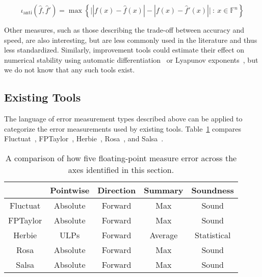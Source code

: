 \documentclass[main.tex]{subfiles}
\begin{document}
\begin{equation*}
\iota_{\text{anti}}(\hat{f},\hat{f}') = \max \left\{ \big| |f(x)-\hat{f}(x)| - |f(x)-\hat{f}'(x)|   
\big|\ :\ x\in \mathbb{F}^n\right\}  
\end{equation*}

Other measures,
  such as those describing the trade-off between accuracy and speed,
  are also interesting, but are less commonly used in the literature
  and thus less standardized.
Similarly,
  improvement tools could estimate their effect on numerical stability
  using automatic differentiation~\cite{} or Lyapunov exponents~\cite{},
  but we do not know that any such tools exist.

\subsection{Existing Tools}

The language of error measurement types described above
  can be applied to categorize the error measurements
  used by existing tools.
Table~\ref{tbl:tools} compares Fluctuat~\cite{Goubault13},
  FPTaylor~\cite{fptaylor-fm15}, Herbie~\cite{pavel15},
  Rosa~\cite{DarulovaK14}, and Salsa~\cite{fmics15}.

\begin{table}[htb]
  \centering
\begin{tabular}{ccccc}
         & Pointwise & Direction & Summary & Soundness \\\hline 
Fluctuat & Absolute        & Forward & Max      & Sound \\
FPTaylor & Absolute        & Forward & Max      & Sound \\
Herbie   & ULPs            & Forward & Average     & Statistical \\
Rosa     & Absolute        & Forward & Max      & Sound \\
Salsa    & Absolute        & Forward & Max      & Sound
\end{tabular}
\caption{A comparison of how five floating-point measure error
  across the axes identified in this section.}
\label{tbl:tools}
\end{table}
\end{document}
